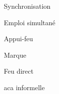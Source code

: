 \begin{e1}
\begin{e2}
\begin{e3}
\begin{e4}
			\end{e4}
		\end{e3}
		
		
		
		 {}
		 {}
	\end{e2}
	\item Synchronisation
	\begin{e2}
		\item Emploi simultané
		\item Appui-feu
		\begin{e3}
			\item Marque
			\begin{e4}
				 {}
				\item Feu direct
			\end{e4}
			\item \gls{aca} informelle
		\end{e3}
	\end{e2}
\end{e1}

